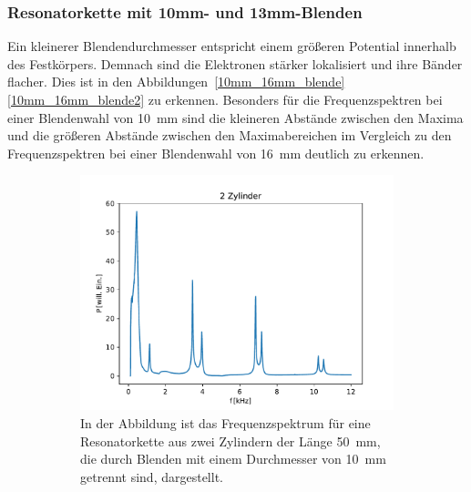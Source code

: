         \subsubsection*{Resonatorkette mit 10mm- und 13mm-Blenden}
            Ein kleinerer Blendendurchmesser entspricht einem größeren Potential innerhalb des Festkörpers. Demnach sind die Elektronen stärker lokalisiert und ihre Bänder flacher. Dies ist in den 
            Abbildungen~\ref{10mm_16mm_blende}\ref{10mm_16mm_blende2} zu erkennen. Besonders für die Frequenzspektren bei einer Blendenwahl von \SI{10}{\milli\metre} sind die kleineren Abstände zwischen den Maxima und die größeren
            Abstände zwischen den Maximabereichen im Vergleich zu den Frequenzspektren bei einer Blendenwahl von \SI{16}{\milli\metre} deutlich zu erkennen.
            \FloatBarrier
            \begin{figure}[ht]
                \centering
                \begin{subfigure}[b]{0.45\textwidth}
                    \centering
                    \includegraphics[scale=0.45]{./pictures/1dim_2_Zylinder_10mm.pdf}
                    \caption{In der Abbildung ist das Frequenzspektrum für eine Resonatorkette aus zwei Zylindern der Länge \SI{50}{\milli\metre}, die durch Blenden mit einem Durchmesser von \SI{10}{\milli\metre} getrennt sind, dargestellt.}
                    \label{fig:1dim_2_Zylinder_10mm}
                \end{subfigure}
                \centering
                \begin{subfigure}[b]{0.45\textwidth}
                    \centering

\end{subfigure}
\end{figure}
